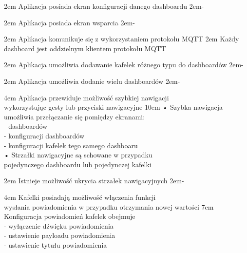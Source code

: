 {2em}{
    Aplikacja posiada ekran konfiguracji danego dashboardu
}
{2em}{-}

{2em}{
    Aplikacja posiada ekran wsparcia
}
{2em}{-}

{2em}{
    Aplikacja komunikuje się z wykorzystaniem protokołu MQTT
}
{2em}{
    Każdy dashboard jest oddzielnym klientem protokołu MQTT
}

{2em}{
    Aplikacja umożliwia dodawanie kafelek różnego typu do dashboardów
}
{2em}{-}

{2em}{
    Aplikacja umożliwia dodanie wielu dashboardów
}
{2em}{-}

{4em}{
    Aplikacja przewiduje możliwość szybkiej nawigacji\\
    wykorzystując gesty lub przyciski nawigacyjne
}
{10em}{
    • Szybka nawigacja umożliwia przełączanie się pomiędzy ekranami:\\
    - dashboardów\\
    - konfiguracji dashboardów\\
    - konfiguracji kafelek tego samego dashboaru\\

    • Strzałki nawigacyjne są schowane w przypadku\\
    \hspace*{0.5em} pojedynczego dashboardu lub pojedynczej kafelki
}

{2em}{
    Istnieje możliwość ukrycia strzałek nawigacyjnych
}
{2em}{-}

{4em}{
    Kafelki posiadają możliwość włączenia funkcji\\
    wysłania powiadomienia w przypadku otrzymania nowej wartości
}
{7em}{
    Konfiguracja powiadomień kafelek obejmuje\\
    - wyłączenie dźwięku powiadomienia\\
    - ustawienie payloadu powiadomienia\\
    - ustawienie tytułu powiadomienia
}

